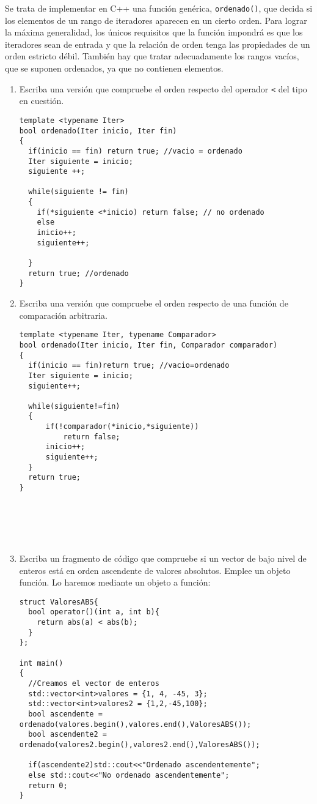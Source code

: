  Se trata de implementar en C++ una función genérica, \texttt{ordenado()}, que decida si los elementos de un rango de iteradores aparecen en un cierto orden. Para lograr la máxima generalidad, los únicos requisitos que la función impondrá es que los iteradores sean de entrada y que la relación de orden tenga las propiedades de un orden estricto débil. También hay que tratar adecuadamente los rangos vacíos, que se suponen ordenados, ya que no contienen elementos.

\begin{enumerate}[label=\alph*)]
  \item Escriba una versión que compruebe el orden respecto del operador \texttt{<} del tipo en cuestión.
\begin{verbatim}
template <typename Iter>
bool ordenado(Iter inicio, Iter fin)
{
  if(inicio == fin) return true; //vacio = ordenado
  Iter siguiente = inicio;
  siguiente ++;

  while(siguiente != fin)
  {
    if(*siguiente <*inicio) return false; // no ordenado
    else
    inicio++;
    siguiente++;
      
  }
  return true; //ordenado
}
  \end{verbatim}
  \item Escriba una versión que compruebe el orden respecto de una función de comparación arbitraria.
\begin{verbatim}
template <typename Iter, typename Comparador>
bool ordenado(Iter inicio, Iter fin, Comparador comparador)
{
  if(inicio == fin)return true; //vacio=ordenado
  Iter siguiente = inicio;
  siguiente++;

  while(siguiente!=fin)
  {
      if(!comparador(*inicio,*siguiente))
          return false;
      inicio++;
      siguiente++;
  }
  return true;
}






\end{verbatim}
  \item Escriba un fragmento de código que compruebe si un vector de bajo nivel de enteros está en orden ascendente de valores absolutos. Emplee un objeto función.
Lo haremos mediante un objeto a función:
\begin{verbatim}
struct ValoresABS{
  bool operator()(int a, int b){
    return abs(a) < abs(b);
  }
};

int main()
{
  //Creamos el vector de enteros
  std::vector<int>valores = {1, 4, -45, 3};
  std::vector<int>valores2 = {1,2,-45,100};
  bool ascendente = ordenado(valores.begin(),valores.end(),ValoresABS());
  bool ascendente2 = ordenado(valores2.begin(),valores2.end(),ValoresABS());

  if(ascendente2)std::cout<<"Ordenado ascendentemente";
  else std::cout<<"No ordenado ascendentemente";
  return 0;
}
\end{verbatim}
\end{enumerate}




